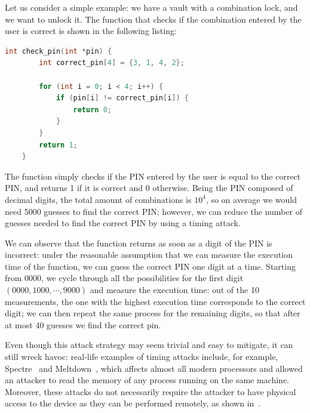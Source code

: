 \begin{example}
    Let us consider a simple example: we have a vault with a combination lock, and we want to unlock it. The function
    that checks if the combination entered by the user is correct is shown in the following listing:

    \begin{lstlisting}[language=C, caption={A non constant-time password checker}, label={lst:nonct_pwd}]
    int check_pin(int *pin) {
        int correct_pin[4] = {3, 1, 4, 2};

        for (int i = 0; i < 4; i++) {
            if (pin[i] != correct_pin[i]) {
                return 0;
            }
        }
        return 1;
    }
    \end{lstlisting}
    
    The function simply checks if the PIN entered by the user is equal to the correct PIN, and returns 1 if it is correct and 0 otherwise.
    Being the PIN composed of decimal digits, the total amount of combinations is $10^4$, so on average we would need 5000 guesses to find
    the correct PIN; however, we can reduce the number of guesses needed to find the correct PIN by using a timing attack.

    We can observe that the function returns as soon as a digit of the PIN is incorrect: under the reasonable assumption that we can measure 
    the execution time of the function, we can guess the correct PIN one digit at a time.
    Starting from 0000, we cycle through all the possibilities for the first digit $(0000, 1000, \cdots, 9000)$ and measure the execution time:
    out of the 10 measurements, the one with the highest execution time corresponds to the correct digit; we can then repeat the same process
    for the remaining digits, so that after at most 40 guesses we find the correct pin.
\end{example}

Even though this attack strategy may seem trivial and easy to mitigate, it can still wreck havoc: real-life examples of timing attacks include, 
for example, Spectre~\cite{DBLP:journals/cacm/KocherHFGGHHLMP20} and Meltdown~\cite{DBLP:journals/cacm/LippSGPHHMKGYHS20}, which affects almost 
all modern processors and allowed an attacker to read the memory of any process running on the same machine. Moreover, these attacks do not
necessarily require the attacker to have physical access to the device as they can be performed remotely, as shown in~\cite{DBLP:journals/cn/BrumleyB05, DBLP:conf/esorics/BrumleyT11}.

